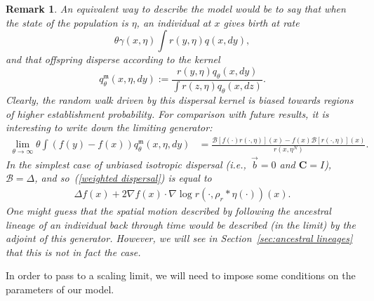 \documentclass[12pt]{article}
\newtheorem{remark}[theorem]{Remark}
\newcommand{\grad}{\nabla}
\newcommand{\DG}{\mathcal{B}}  %
\newcommand{\meanq}{\vec b}    %
\newcommand{\covq}{\mathbf{C}}     %
\newcommand{\kernel}{\rho}  %
\newcommand{\smooth}[1]{\kernel_{#1} \! * \!}  %
\numberwithin{equation}{section}
\begin{document}
\begin{remark}
\label{ancestral lineages: first guess}
An equivalent way to describe the model would be to say that
when the state of the population is $\eta$,
an individual at $x$ gives birth at rate
$$
    \theta \gamma(x, \eta)
    \int r(y, \eta) q(x, dy) ,
$$
and that offspring disperse according to the kernel
$$
    q_\theta^\mathfrak{m}(x,\eta,dy)
    :=
    \frac{
        r(y, \eta) q_\theta(x, dy)
    }{
        \int r(z, \eta) q_\theta(x, dz)
    } .
$$
Clearly, the random walk driven by this dispersal kernel
is biased towards regions of higher establishment probability.
For comparison with future results,
it is interesting to write down the limiting generator:
\begin{align}
	\label{weighted dispersal}
    \lim_{\theta \to \infty}
    \theta \int (f(y) - f(x)) q_\theta^\mathfrak{m}(x, \eta, dy)
    &=
    \frac{
        \DG\left[ f(\cdot) r(\cdot, \eta) \right](x)
        - 
        f(x) \DG\left[ r(\cdot, \eta) \right](x)
    }{
        r(x, \eta^{N})
    } .
\end{align}
In the simplest case of unbiased isotropic dispersal
(i.e.,~$\meanq = 0$ and $\covq = I$), $\DG = \Delta$,
and so~(\ref{weighted dispersal}) is equal to
\begin{align*}
    \Delta f(x) + 2 \grad f(x) \cdot \grad \log r(\cdot, \smooth{r} \eta(\cdot))(x) .
\end{align*}
One might guess that the spatial motion described by following  
the ancestral lineage of an individual 
back through time
would be described (in the limit) by the adjoint of this generator.
However, we will see in Section~\ref{sec:ancestral lineages}
that this is not in fact the case.
\end{remark}

In order to pass to a scaling limit, we will need to impose some 
conditions on the parameters of our model.
\end{document}
